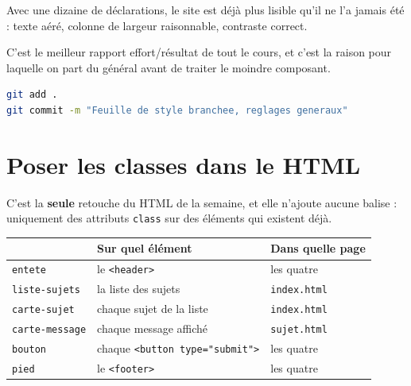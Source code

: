 \documentclass[a4paper,11pt]{article}
\newcommand{\hdr}[1]{\multicolumn{1}{l}{\color{white}\bfseries #1}}
\renewcommand{\arraystretch}{1.3}
\begin{document}
\begin{tcolorbox}[attention, title={Regarde la page maintenant}]
Avec une dizaine de déclarations, le site est déjà plus lisible qu'il ne l'a jamais été : texte aéré, colonne de largeur raisonnable, contraste correct.

\vspace{3pt}
C'est le meilleur rapport effort/résultat de tout le cours, et c'est la raison pour laquelle on part du général avant de traiter le moindre composant.
\end{tcolorbox}

\begin{tcolorbox}[astuce, title={Point d'étape}]
\begin{lstlisting}[language=bash, numbers=none]
git add .
git commit -m "Feuille de style branchee, reglages generaux"
\end{lstlisting}
\end{tcolorbox}

\section{Poser les classes dans le HTML}

C'est la \textbf{seule} retouche du HTML de la semaine, et elle n'ajoute aucune balise : uniquement des attributs \texttt{class} sur des éléments qui existent déjà.

\begin{center}
\renewcommand{\arraystretch}{1.0}
\begin{tabularx}{\linewidth}{p{3.6cm}p{3.4cm}X}
  \toprule
  \rowcolor{uniNavy}
  \hdr{Classe} & \hdr{Sur quel élément} & \hdr{Dans quelle page} \\
  \midrule
  \rowcolor{uniPaper}
  \texttt{entete} & le \texttt{<header>} & les quatre \\
  \texttt{liste-sujets} & la liste des sujets & \texttt{index.html} \\
  \rowcolor{uniPaper}
  \texttt{carte-sujet} & chaque sujet de la liste & \texttt{index.html} \\
  \texttt{carte-message} & chaque message affiché & \texttt{sujet.html} \\
  \rowcolor{uniPaper}
  \texttt{bouton} & chaque \texttt{<button type="submit">} & les quatre \\
  \texttt{pied} & le \texttt{<footer>} & les quatre \\
  \bottomrule
\end{tabularx}
\end{center}
\end{document}

